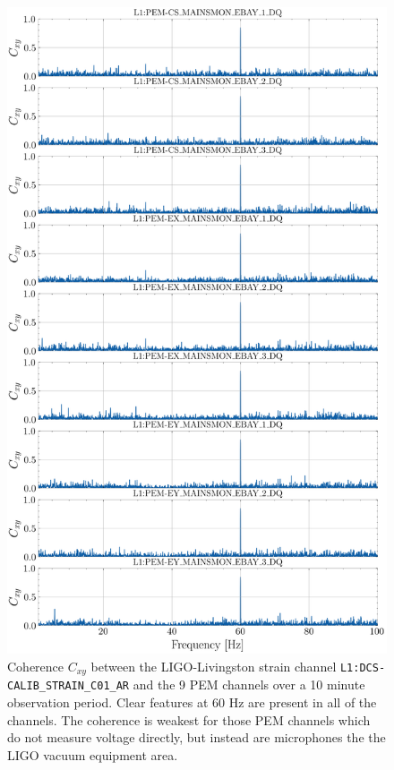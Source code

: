 \documentclass[pra,superscriptaddress,reprint,amsmath,amssymb,nofootinbib]{revtex4-2}
\begin{document}
\begin{figure}
	\begin{center}
		\includegraphics[width=\columnwidth]{images/stacked_coherence_plot}
	\end{center}
	\label{correlation_2}
	\caption{Coherence $C_{xy}$ between the LIGO-Livingston strain channel  \texttt{L1:DCS-CALIB\_STRAIN\_C01\_AR} and the 9 PEM channels over a 10 minute observation period. Clear features at 60 Hz are present in all of the channels. The coherence is weakest for those PEM channels which do not measure voltage directly, but instead are microphones the the LIGO vacuum equipment area.}
\end{figure}
\end{document}
